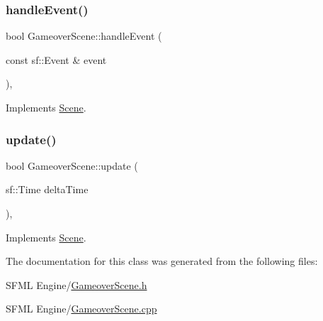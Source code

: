 \subsubsection{\texorpdfstring{handle\+Event()}{handleEvent()}}
{\footnotesize\ttfamily bool Gameover\+Scene\+::handle\+Event (\begin{DoxyParamCaption}\item[{const sf\+::\+Event \&}]{event }\end{DoxyParamCaption})\hspace{0.3cm}{\ttfamily [override]}, {\ttfamily [virtual]}}



Implements \hyperlink{class_scene_af25e4d2c998aca4e95899fb67488e815}{Scene}.

\mbox{\label{class_gameover_scene_a6b7f650af840f54c78b4fb1cdf2010df}} 
\subsubsection{\texorpdfstring{update()}{update()}}
{\footnotesize\ttfamily bool Gameover\+Scene\+::update (\begin{DoxyParamCaption}\item[{sf\+::\+Time}]{delta\+Time }\end{DoxyParamCaption})\hspace{0.3cm}{\ttfamily [override]}, {\ttfamily [virtual]}}



Implements \hyperlink{class_scene_a72683c984a1da2ce4f757705e93730f2}{Scene}.



The documentation for this class was generated from the following files\+:\begin{DoxyCompactItemize}
\item 
S\+F\+M\+L Engine/\hyperlink{_gameover_scene_8h}{Gameover\+Scene.\+h}\item 
S\+F\+M\+L Engine/\hyperlink{_gameover_scene_8cpp}{Gameover\+Scene.\+cpp}\end{DoxyCompactItemize}
